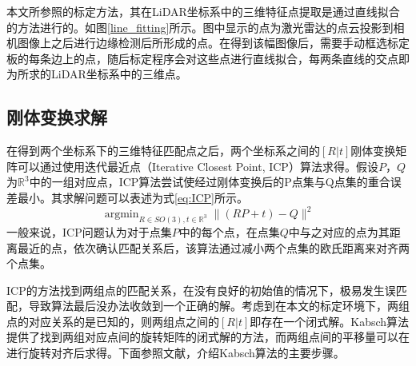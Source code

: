 本文所参照的标定方法，其在LiDAR坐标系中的三维特征点提取是通过直线拟合的方法进行的。如图\ref{line_fitting}所示。图中显示的点为激光雷达的点云投影到相机图像上之后进行边缘检测后所形成的点。在得到该幅图像后，需要手动框选标定板的每条边上的点，随后标定程序会对这些点进行直线拟合，每两条直线的交点即为所求的LiDAR坐标系中的三维点。

\subsection{刚体变换求解}

在得到两个坐标系下的三维特征匹配点之后，两个坐标系之间的$[R|t]$刚体变换矩阵可以通过使用迭代最近点（Iterative Closest Point, ICP）算法求得。假设$P$，$Q$为$\mathbb{R}^3$中的一组对应点，ICP算法尝试使经过刚体变换后的P点集与Q点集的重合误差最小。其求解问题可以表述为式\ref{eq:ICP}所示。
\begin{equation}
    \mathop{\arg\min}_{R\in SO(3), t\in \mathbb{R}^3}  \| (RP+t)-Q \|^2 
    \label{eq:ICP}
\end{equation}
一般来说，ICP问题认为对于点集$P$中的每个点，在点集$Q$中与之对应的点为其距离最近的点，依次确认匹配关系后，该算法通过减小两个点集的欧氏距离来对齐两个点集。

ICP的方法找到两组点的匹配关系，在没有良好的初始值的情况下，极易发生误匹配，导致算法最后没办法收敛到一个正确的解。考虑到在本文的标定环境下，两组点的对应关系的是已知的，则两组点之间的$[R|t]$即存在一个闭式解。Kabsch算法提供了找到两组对应点间的旋转矩阵的闭式解的方法，而两组点间的平移量可以在进行旋转对齐后求得。下面参照文献，介绍Kabsch算法的主要步骤。

